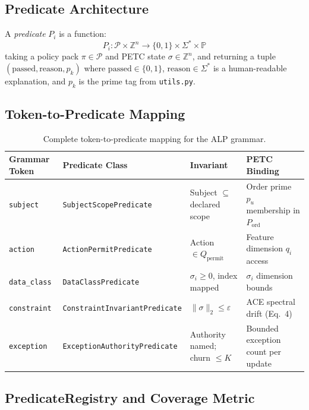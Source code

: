 \documentclass[12pt,letterpaper]{article}
\theoremstyle{definition}
\theoremstyle{remark}
\begin{document}
\subsection{Predicate Architecture}

A \emph{predicate} \(P_i\) is a function:
\[
  P_i: \mathcal{P} \times \mathbb{Z}^n \to \{0,1\} \times \Sigma^* \times \mathbb{P}
  \tag{14}
\]
taking a policy pack \(\pi \in \mathcal{P}\) and PETC state \(\sigma \in \mathbb{Z}^n\),
and returning a tuple \((\text{passed}, \text{reason}, p_k)\) where \(\text{passed}
\in \{0,1\}\), \(\text{reason} \in \Sigma^*\) is a human-readable explanation, and
\(p_k\) is the prime tag from \texttt{utils.py}.

\subsection{Token-to-Predicate Mapping}

\begin{table}[H]
\centering
\small
\begin{tabular}{@{}lllp{4.5cm}@{}}
\toprule
\textbf{Grammar Token} & \textbf{Predicate Class} & \textbf{Invariant} & \textbf{PETC Binding} \\
\midrule
\texttt{subject}    & \texttt{SubjectScopePredicate}     & Subject \(\subseteq\) declared scope   & Order prime \(p_u\) membership in \(P_{\text{ord}}\) \\
\texttt{action}     & \texttt{ActionPermitPredicate}     & Action \(\in Q_{\text{permit}}\)       & Feature dimension \(q_i\) access \\
\texttt{data\_class} & \texttt{DataClassPredicate}       & \(\sigma_i \geq 0\), index mapped      & \(\sigma_i\) dimension bounds \\
\texttt{constraint} & \texttt{ConstraintInvariantPredicate} & \(\|\sigma\|_2 \leq \varepsilon\)   & ACE spectral drift (Eq.\ 4) \\
\texttt{exception}  & \texttt{ExceptionAuthorityPredicate} & Authority named; churn \(\leq K\)    & Bounded exception count per update \\
\bottomrule
\end{tabular}
\caption{Complete token-to-predicate mapping for the ALP grammar.}
\end{table}

\subsection{PredicateRegistry and Coverage Metric}
\end{document}
